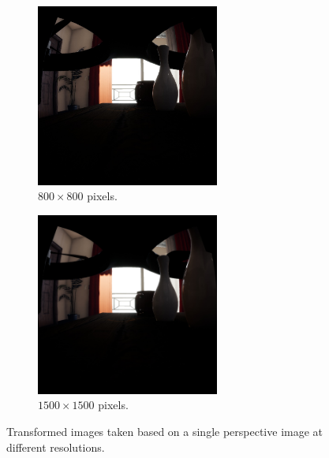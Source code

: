 \begin{figure}[!htb]
    \begin{subfigure}{0.45\textwidth}
        \centering
        \includegraphics[height=6cm]{rapport/fig/Results/single/single_1024_800.jpeg}
        \caption{$800 \times 800$ pixels.}
        \label{fig:res_comp_single_1024_800}
    \end{subfigure}
    \begin{subfigure}{0.45\textwidth}
        \centering
        \includegraphics[height=6cm]{rapport/fig/Results//single/single_2048_1500.jpeg}
        \caption{$1500 \times 1500$ pixels.}
        \label{fig:res_comp_single_2048_1500}
    \end{subfigure}
    \caption{Transformed images taken based on a single perspective image at different resolutions.}
    \label{fig:res_comp_single}    
\end{figure}

